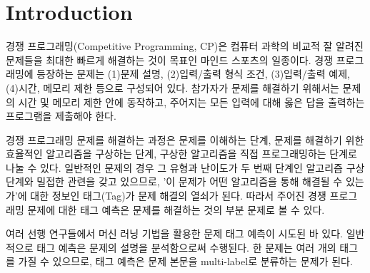 \documentclass{article}
\begin{document}


\section{Introduction}
경쟁 프로그래밍(Competitive Programming, CP)은 컴퓨터 과학의 비교적 잘 알려진 문제들을 최대한 빠르게 해결하는 것이 
목표인 마인드 스포츠의 일종이다.
경쟁 프로그래밍에 등장하는 문제는 (1)문제 설명, (2)입력/출력 형식 조건, (3)입력/출력 예제, (4)시간, 메모리 제한 등으로 구성되어 있다.
참가자가 문제를 해결하기 위해서는 문제의 시간 및 메모리 제한 안에 동작하고, 주어지는 모든 입력에 대해 옳은 답을 출력하는 프로그램을 제출해야 한다\cite{halim2013competitive}.

경쟁 프로그래밍 문제를 해결하는 과정은 문제를 이해하는 단계, 문제를 해결하기 위한 효율적인 알고리즘을 구상하는 단계, 구상한 알고리즘을 직접 프로그래밍하는 단계로 나눌 수 있다\cite{alphacode}.
일반적인 문제의 경우 그 유형과 난이도가 두 번째 단계인 알고리즘 구상 단계와 밀접한 관련을 갖고 있으므로, '이 문제가 어떤 알고리즘을 통해 해결될 수 있는가'에 대한 정보인 태그(Tag)가 문제 해결의 열쇠가 된다.
따라서 주어진 경쟁 프로그래밍 문제에 대한 태그 예측은 문제를 해결하는 것의 부분 문제로 볼 수 있다.

여러 선행 연구들에서 머신 러닝 기법을 활용한 문제 태그 예측이 시도된 바 있다\cite{iancu2019multilabel, athavale2019}.
일반적으로 태그 예측은 문제의 설명을 분석함으로써 수행된다. 
한 문제는 여러 개의 태그를 가질 수 있으므로, 태그 예측은 문제 본문을 multi-label로 분류하는 문제가 된다.
\end{document}
